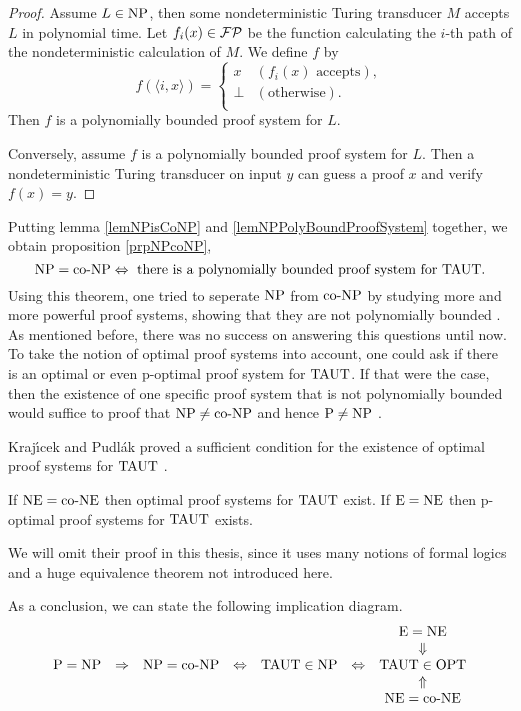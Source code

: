   \begin{proof}
   Assume \(L \in \text{NP}\), then some nondeterministic Turing transducer \(M\) accepts \(L\) in polynomial time. Let \(f_i(x) \in \mathcal{FP}\) be the function calculating the \(i\)-th path of the nondeterministic calculation of \(M\). We define \(f\) by
   \[
     f(\langle i, x \rangle) =
     \begin{cases}
       x & (f_i(x) \text{ accepts}), \\
       \perp & (\text{otherwise}). \\
     \end{cases}
   \]
   Then \(f\) is a polynomially bounded proof system for \(L\).

   Conversely, assume \(f\) is a polynomially bounded proof system for \(L\). Then a nondeterministic Turing transducer on input \(y\) can guess a proof \(x\) and verify \(f(x) = y\).
  \end{proof}

  Putting lemma \ref{lemNPisCoNP} and \ref{lemNPPolyBoundProofSystem} together, we obtain proposition \ref{prpNPcoNP},
  \[
    \text{NP} = \text{co-NP} \Leftrightarrow \text{ there is a polynomially bounded proof system for } \text{TAUT}.
  \]
  Using this theorem, one tried to seperate \(\text{NP}\) from \(\text{co-NP}\) by studying more and more powerful proof systems, showing that they are not polynomially bounded \cite{KMT03}. As mentioned before, there was no success on answering this questions until now. To take the notion of optimal proof systems into account, one could ask if there is an optimal or even p-optimal proof system for \(\text{TAUT}\). If that were the case, then the existence of one specific proof system that is not polynomially bounded would suffice to proof that \(\text{NP} \neq \text{co-NP}\) and hence \(\text{P} \neq \text{NP}\) \cite{KMT03}.

  Kraj\'{\i}cek and Pudl{\'a}k proved a sufficient condition for the existence of optimal proof systems for \(\text{TAUT}\) \cite{KP89}.

  \begin{theorem}
    If \(\text{NE} = \text{co-NE}\) then optimal proof systems for \(\text{TAUT}\) exist. If \(\text{E} = \text{NE}\) then p-optimal proof systems for \(\text{TAUT}\) exists.
  \end{theorem}

  We will omit their proof in this thesis, since it uses many notions of formal logics and a huge equivalence theorem not introduced here.
  
  \begin{corollary}
    As a conclusion, we can state the following implication diagram.
    \[
      \begin{array}{ccccccc}
      &&&&&& \text{E} = \text{NE} \\
      &&&&&& \Downarrow \\
      \text{P} = \text{NP} & \Rightarrow & \text{NP} = \text{co-NP} & \Leftrightarrow & \text{TAUT} \in \text{NP} & \Leftrightarrow & \text{TAUT} \in \text{OPT} \\
      &&&&&& \Uparrow \\
      &&&&&& \text{NE} = \text{co-NE} \\
      \end{array}
    \]
  \end{corollary}





  